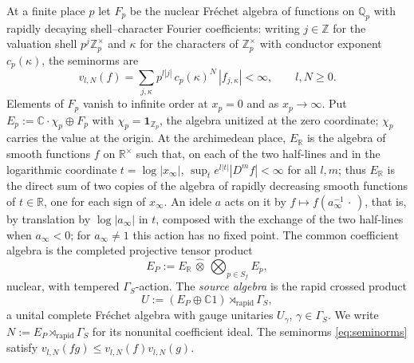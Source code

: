 \documentclass[11pt]{amsart}
\theoremstyle{definition}
\theoremstyle{remark}
\newcommand{\C}{\mathbb C}
\newcommand{\R}{\mathbb R}
\newcommand{\Z}{\mathbb Z}
\newcommand{\Q}{\mathbb Q}
\begin{document}
At a finite place $p$ let $F_p$ be the nuclear Fr\'echet algebra of functions
on $\Q_p$ with rapidly decaying shell--character Fourier coefficients: writing
$j\in\Z$ for the valuation shell $p^{j}\Z_p^{\times}$ and $\kappa$ for the
characters of $\Z_p^{\times}$ with conductor exponent $c_p(\kappa)$, the
seminorms are
\begin{equation}\label{eq:seminorms}
v_{l,N}(f)=\sum_{j,\kappa}p^{l|j|}\,c_p(\kappa)^{N}\,|f_{j,\kappa}|<\infty ,
\qquad l,N\ge0 .
\end{equation}
Elements of $F_p$ vanish to infinite order at $x_p=0$ and as $x_p\to\infty$.
Put $E_p:=\C\cdot\chi_p\oplus F_p$ with $\chi_p=\mathbf 1_{\Z_p}$, the algebra
unitized at the zero coordinate; $\chi_p$ carries the value at the origin.  At
the archimedean place, $E_{\R}$ is the algebra of smooth functions $f$ on
$\R^{\times}$ such that, on each of the two half-lines and in the logarithmic
coordinate $t=\log|x_{\infty}|$,
$\sup_t e^{l|t|}|D^{m}f|<\infty$ for all $l,m$; thus $E_{\R}$ is the direct
sum of two copies of the algebra of rapidly decreasing smooth functions of
$t\in\R$, one for each sign of $x_{\infty}$.  An idele $a$ acts on it by
$f\mapsto f(a_{\infty}^{-1}\,\cdot\,)$, that is, by translation by
$\log|a_{\infty}|$ in $t$, composed with the exchange of the two half-lines
when $a_{\infty}<0$; for $a_{\infty}\ne1$ this action has no fixed point.  The
common coefficient algebra is the completed projective tensor product
\begin{equation}\label{eq:coeff}
E_P:=E_{\R}\,\widehat\otimes\,\bigotimes_{p\in S_f}E_p ,
\end{equation}
nuclear, with tempered $\Gamma_S$-action.  The \emph{source algebra} is the
rapid crossed product
\begin{equation}\label{eq:source}
U:=(E_P\oplus\C 1)\rtimes_{\mathrm{rapid}}\Gamma_S ,
\end{equation}
a unital complete Fr\'echet algebra with gauge unitaries $U_{\gamma}$,
$\gamma\in\Gamma_S$.  We write $N:=E_P\rtimes_{\mathrm{rapid}}\Gamma_S$ for
its nonunital coefficient ideal.  The seminorms \eqref{eq:seminorms} satisfy
$v_{l,N}(fg)\le v_{l,N}(f)v_{l,N}(g)$.
\end{document}
